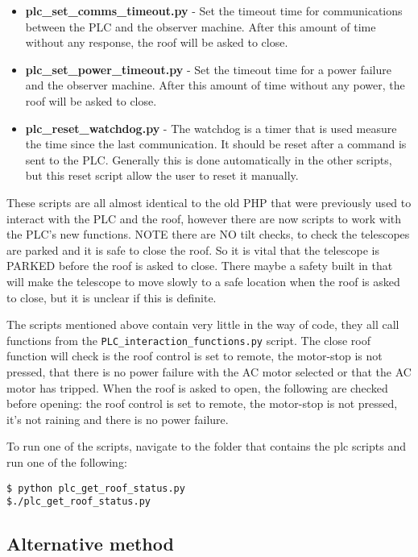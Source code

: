 \documentclass[a4paper,12pt]{article}
\begin{document}
\begin{itemize}
\item{{\bf plc\_set\_comms\_timeout.py} - Set the timeout time for communications between the PLC and the observer machine. After this amount of time without any response, the roof will be asked to close.}
\item{{\bf plc\_set\_power\_timeout.py} - Set the timeout time for a power failure and the observer machine. After this amount of time without any power, the roof will be asked to close.}
\item{{\bf plc\_reset\_watchdog.py} - The watchdog is a timer that is used measure the time since the last communication. It should be reset after a command is sent to the PLC. Generally this is done automatically in the other scripts, but this reset script allow the user to reset it manually.}
\end{itemize}

These scripts are all almost identical to the old PHP that were previously used to interact with the PLC and the roof, however there are now scripts to work with the PLC's new functions. {\color{blue}NOTE there are NO tilt checks, to check the telescopes are parked and it is safe to close the roof. So it is vital that the telescope is PARKED before the roof is asked to close.} There maybe a safety built in that will make the telescope to move slowly to a safe location when the roof is asked to close, but it is unclear if this is definite. 

The scripts mentioned above contain very little in the way of code, they all call functions from the {\tt PLC\_interaction\_functions.py} script. The close roof function will check is the roof control is set to remote, the motor-stop is not pressed, that there is no power failure with the AC motor selected or that the AC motor has tripped. When the roof is asked to open, the following are checked before opening: the roof control is set to remote, the motor-stop is not pressed, it's not raining and there is no power failure.

To run one of the scripts, navigate to the folder that contains the plc scripts and run one of the following:
\begin{verbatim}
$ python plc_get_roof_status.py
$./plc_get_roof_status.py
\end{verbatim}

\subsection{Alternative method}
\end{document}
